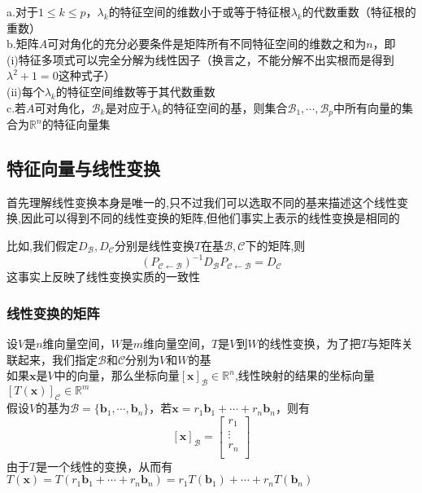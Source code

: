 \documentclass{article}
\newcommand{\ve}{\boldsymbol}
\begin{document}
\begin{CJK}{UTF8}{gkai}
a.对于$1\leq k \leq p$，$\lambda_k$的特征空间的维数小于或等于特征根$\lambda_k$的代数重数（特征根的重数）\\

b.矩阵$A$可对角化的充分必要条件是矩阵所有不同特征空间的维数之和为$n$，即\\
(i)特征多项式可以完全分解为线性因子（换言之，不能分解不出实根而是得到$\lambda^2 + 1 = 0$这种式子）\\
(ii)每个$\lambda_k$的特征空间维数等于其代数重数\\

c.若$A$可对角化，$\mathcal{B}_k$是对应于$\lambda_k$的特征空间的基，则集合$\mathcal{B}_1,\cdots,\mathcal{B}_p$中所有向量的集合为$\mathbb{R}^n$的特征向量集\\

\subsection{特征向量与线性变换}
首先理解线性变换本身是唯一的,只不过我们可以选取不同的基来描述这个线性变换,因此可以得到不同的线性变换的矩阵,但他们事实上表示的线性变换是相同的

比如,我们假定$D_{\mathcal{B}},D_{\mathcal{C}}$分别是线性变换$T$在基$\mathcal{B},\mathcal{C}$下的矩阵,则
\[(P_{\mathcal{C}\leftarrow\mathcal{B}})^{-1} D_{\mathcal{B}} P_{\mathcal{C}\leftarrow\mathcal{B}} = D_{\mathcal{C}}\]
这事实上反映了线性变换实质的一致性
\subsubsection{线性变换的矩阵}
设$V$是$n$维向量空间，$W$是$m$维向量空间，$T$是$V$到$W$的线性变换，为了把$T$与矩阵关联起来，我们指定$\mathcal{B}$和$\mathcal{C}$分别为$V$和$W$的基\\

如果$\ve{x}$是$V$中的向量，那么坐标向量$[\ve{x}]_{\mathcal{B}}\in\mathbb{R}^n$,线性映射的结果的坐标向量$[T(\ve{x})]_{\mathcal{C}}\in\mathbb{R}^m$\\

假设$V$的基为$\mathcal{B}=\{\ve{b}_1,\cdots,\ve{b}_n\}$，若$\ve{x}=r_1\ve{b}_1+\cdots+r_n\ve{b}_n$，则有
\[[\ve{x}]_{\mathcal{B}}=
\begin{bmatrix}
    r_1\\
    \vdots\\
    r_n\\
\end{bmatrix}\]
由于$T$是一个线性的变换，从而有$T(\ve{x})=T(r_1\ve{b}_1+\cdots+r_n\ve{b}_n)=r_1T(\ve{b}_1)+\cdots+r_nT(\ve{b}_n)$\\


\end{CJK}
\end{document}
